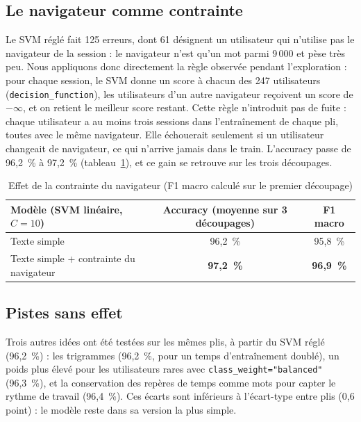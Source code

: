 \documentclass{rapportECL}
\newcommand{\tok}[1]{\texttt{\small #1}}
\begin{document}
\subsection{Le navigateur comme contrainte}
\label{sec:nav}

Le SVM réglé fait 125 erreurs, dont 61 désignent un utilisateur qui n'utilise pas le navigateur de la session : le navigateur n'est qu'un mot parmi 9\,000 et pèse très peu. Nous appliquons donc directement la règle observée pendant l'exploration : pour chaque session, le SVM donne un score à chacun des 247 utilisateurs (\tok{decision\_function}), les utilisateurs d'un autre navigateur reçoivent un score de $-\infty$, et on retient le meilleur score restant. Cette règle n'introduit pas de fuite : chaque utilisateur a au moins trois sessions dans l'entraînement de chaque pli, toutes avec le même navigateur. Elle échouerait seulement si un utilisateur changeait de navigateur, ce qui n'arrive jamais dans le train. L'accuracy passe de 96,2~\% à 97,2~\% (tableau~\ref{tab:evolution}), et ce gain se retrouve sur les trois découpages.

\begin{table}[!htbp]
\centering\small
\begin{tabular}{lcc}
\toprule
Modèle (SVM linéaire, $C = 10$) & Accuracy (moyenne sur 3 découpages) & F1 macro \\
\midrule
Texte simple & 96,2~\% & 95,8~\% \\
Texte simple + contrainte du navigateur & \textbf{97,2~\%} & \textbf{96,9~\%} \\
\bottomrule
\end{tabular}
\caption{Effet de la contrainte du navigateur (F1 macro calculé sur le premier découpage)}
\label{tab:evolution}
\end{table}

\subsection{Pistes sans effet}

Trois autres idées ont été testées sur les mêmes plis, à partir du SVM réglé (96,2~\%) : les trigrammes (96,2~\%, pour un temps d'entraînement doublé), un poids plus élevé pour les utilisateurs rares avec \tok{class\_weight="balanced"} (96,3~\%), et la conservation des repères de temps comme mots pour capter le rythme de travail (96,4~\%). Ces écarts sont inférieurs à l'écart-type entre plis (0,6 point) : le modèle reste dans sa version la plus simple.
\end{document}
